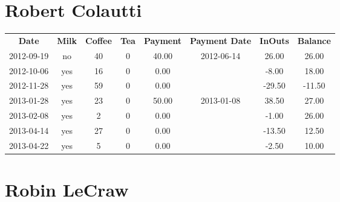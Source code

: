 \section{Robert Colautti}

\begin{center}
\begin{tabular}{cccccccc}
\textbf{Date} & \textbf{Milk} & \textbf{Coffee} & \textbf{Tea} & \textbf{Payment} & \textbf{Payment Date} & \textbf{InOuts} & \textbf{Balance} \\
2012-09-19 & no & 40 & 0 & 40.00 & 2012-06-14 &  26.00 &  26.00\\ 
2012-10-06 & yes & 16 & 0 &  0.00 &  &  -8.00 &  18.00\\ 
2012-11-28 & yes & 59 & 0 &  0.00 &  & -29.50 & -11.50\\ 
2013-01-28 & yes & 23 & 0 & 50.00 & 2013-01-08 &  38.50 &  27.00\\ 
2013-02-08 & yes &  2 & 0 &  0.00 &  &  -1.00 &  26.00\\ 
2013-04-14 & yes & 27 & 0 &  0.00 &  & -13.50 &  12.50\\ 
2013-04-22 & yes &  5 & 0 &  0.00 &  &  -2.50 &  10.00
\end{tabular}
\end{center}

\section{Robin LeCraw}

